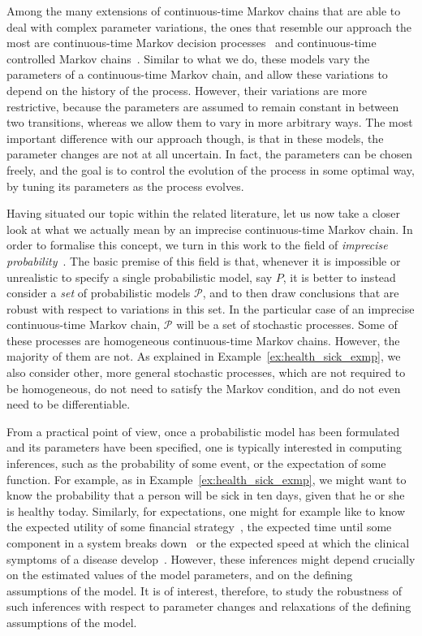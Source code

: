 \documentclass[10pt,a4paper]{paper}
\theoremstyle{definition}
\begin{document}
Among the many extensions of continuous-time Markov chains that are able to deal with complex parameter variations, the ones that resemble our approach the most are continuous-time Markov decision processes~\cite{Xianping:2009} and continuous-time controlled Markov chains~\cite{guo2003}. Similar to what we do, these models vary the parameters of a continuous-time Markov chain, and allow these variations to depend on the history of the process. However, their variations are more restrictive, because the parameters are assumed to remain constant in between two transitions, whereas we allow them to vary in more arbitrary ways. The most important difference with our approach though, is that in these models, the parameter changes are not at all uncertain. In fact, the parameters can be chosen freely, and the goal is to control the evolution of the process in some optimal way, by tuning its parameters as the process evolves.


Having situated our topic within the related literature, let us now take a closer look at what we actually mean by an imprecise continuous-time Markov chain.
In order to formalise this concept, we turn in this work to the field of \emph{imprecise probability}~\cite{Walley:1991vk,troffaes2013:lp,augustin2013:itip}. The basic premise of this field is that, whenever it is impossible or unrealistic to specify a single probabilistic model, say $P$, it is better to instead consider a \emph{set} of probabilistic models $\mathcal{P}$, and to then draw conclusions that are robust with respect to variations in this set. In the particular case of an imprecise continuous-time Markov chain, $\mathcal{P}$ will be a set of stochastic processes. Some of these processes are homogeneous continuous-time Markov chains. However, the majority of them are not. As explained in Example~\ref{ex:health_sick_exmp}, we also consider other, more general stochastic processes, which are not required to be homogeneous, do not need to satisfy the Markov condition, and do not even need to be differentiable.


From a practical point of view, once a probabilistic model has been formulated and its parameters have been specified, one is typically interested in computing inferences, such as the probability of some event, or the expectation of some function. For example, as in Example~\ref{ex:health_sick_exmp}, we might want to know the probability that a person will be sick in ten days, given that he or she is healthy today.
Similarly, for expectations, one might for example like to know the expected utility of some financial strategy~\cite{sass2004optimizing}, the expected time until some component in a system breaks down~\cite{besnard2010approach} or the expected speed at which the clinical symptoms of a disease develop~\cite{duffy1995estimation}. However, these inferences might depend crucially on the estimated values of the model parameters, and on the defining assumptions of the model.
It is of interest, therefore, to study the robustness of such inferences with respect to parameter changes and relaxations of the defining assumptions of the model.
\end{document}

